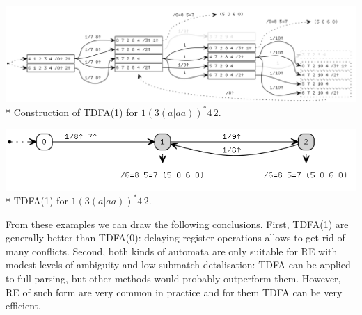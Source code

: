 \documentclass{article}
\theoremstyle{definition}
\begin{document}
\begin{multicols}{2}
\begin{center}
\includegraphics[width=\linewidth]{img/example4/tdfa1_raw.png}\\*
\footnotesize{Construction of TDFA(1) for $1 (3 (a | aa) )^* 4 \, 2$.} \\
\end{center}
\begin{center}
\includegraphics[width=0.85\linewidth]{img/example4/tdfa1.png}\\*
\footnotesize{TDFA(1) for $1 (3 (a | aa) )^* 4 \, 2$.} \\
\end{center}

From these examples we can draw the following conclusions.
First, TDFA(1) are generally better than TDFA(0): delaying register operations allows to get rid of many conflicts.
Second, both kinds of automata are only suitable for RE with modest levels of ambiguity
and low submatch detalisation: TDFA can be applied to full parsing, but other methods would probably outperform them.
However, RE of such form are very common in practice and for them TDFA can be very efficient.




\end{multicols}
\end{document}
